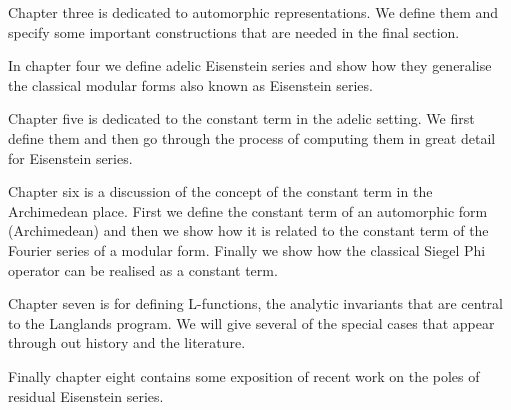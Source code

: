 Chapter three is dedicated to automorphic representations. We define them and specify some important constructions that are needed in the final section.

In chapter four we define adelic Eisenstein series and show how they generalise the classical modular forms also known as Eisenstein series.

Chapter five is dedicated to the constant term in the adelic setting. We first define them and then go through the process of computing them in great detail for Eisenstein series. 

Chapter six is a discussion of the concept of the constant term in the Archimedean place. First we define the constant term of an automorphic form (Archimedean) and then we show how it is related to the constant term of the Fourier series of a modular form. Finally we show how the classical Siegel Phi operator can be realised as a constant term.

Chapter seven is for defining L-functions, the analytic invariants that are central to the Langlands program. We will give several of the special cases that appear through out history and the literature. 

Finally chapter eight contains some exposition of recent work on the poles of residual Eisenstein series.


